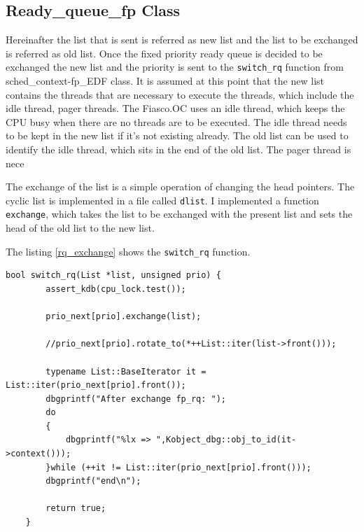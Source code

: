 \subsection{Ready\_queue\_fp Class}
Hereinafter the list that is sent is referred as new list and the list to be exchanged is referred as old list. Once the fixed priority ready queue is decided to be exchanged the new list and the priority is sent to the \texttt{switch\_rq} function from sched\_context-fp\_EDF class. It is assumed at this point that the new list contains the threads that are necessary to execute the threads, which include the idle thread, pager threads. The Fiasco.OC uses an idle thread, which keeps the CPU busy when there are no threads are to be executed. The idle thread needs to be kept in the new list if it's not existing already. The old list can be used to identify the idle thread, which sits in the end of the old list. The pager thread is nece

The exchange of the list is a simple operation of changing the head pointers. The cyclic list is implemented in a file called \texttt{dlist}. I implemented a function \texttt{exchange}, which takes the list to be exchanged with the present list and sets the head of the old list to the new list. 

The listing \ref{rq_exchange} shows the \texttt{switch\_rq} function.

 \begin{lstlisting}[caption={Exchanging the ready queue},label=rq_exchange, style=customcpp]
 bool switch_rq(List *list, unsigned prio) {
   		assert_kdb(cpu_lock.test());
 
   		prio_next[prio].exchange(list);
 
   		//prio_next[prio].rotate_to(*++List::iter(list->front()));
 
   		typename List::BaseIterator it = List::iter(prio_next[prio].front());
   		dbgprintf("After exchange fp_rq: ");
   		do
   		{
   			dbgprintf("%lx => ",Kobject_dbg::obj_to_id(it->context()));
   		}while (++it != List::iter(prio_next[prio].front()));
   		dbgprintf("end\n");
 
   		return true;
   	}
 
\end{lstlisting}